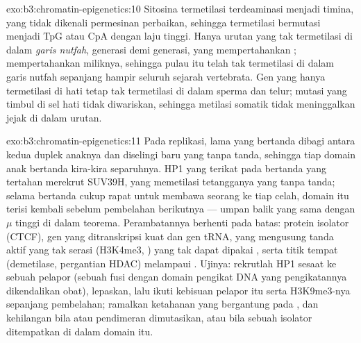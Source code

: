 \begin{solution}{exo:b3:chromatin-epigenetics:10}
Sitosina termetilasi terdeaminasi menjadi timina, yang tidak dikenali
permesinan perbaikan, sehingga  termetilasi bermutasi menjadi TpG atau CpA
dengan laju tinggi. Hanya urutan yang tak termetilasi di dalam \emph{garis
nutfah}, generasi demi generasi, yang mempertahankan ; 
mempertahankan miliknya, sehingga pulau itu telah tak termetilasi di dalam
garis nutfah sepanjang hampir seluruh sejarah vertebrata. Gen yang hanya
termetilasi di hati tetap tak termetilasi di dalam sperma dan telur; mutasi
yang timbul di sel hati tidak diwariskan, sehingga metilasi somatik tidak
meninggalkan jejak di dalam urutan.
\end{solution}

\begin{solution}{exo:b3:chromatin-epigenetics:11}
Pada replikasi,  lama yang bertanda dibagi antara kedua duplek anaknya
dan diselingi  baru yang tanpa tanda, sehingga tiap domain anak
bertanda kira-kira separuhnya. HP1 yang terikat pada  bertanda yang
tertahan merekrut SUV39H, yang memetilasi tetangganya yang tanpa tanda;
selama  bertanda cukup rapat untuk membawa seorang  ke tiap
celah, domain itu terisi kembali sebelum pembelahan berikutnya --- umpan
balik yang sama dengan $\mu$ tinggi di dalam teorema. Perambatannya berhenti
pada batas: protein isolator (CTCF), gen yang ditranskripsi kuat dan gen
tRNA,  yang mengusung tanda aktif yang tak serasi (H3K4me3,
) yang tak dapat dipakai , serta titik tempat 
(demetilase, pergantian HDAC) melampaui . Ujinya: rekrutlah HP1
sesaat ke sebuah pelapor (sebuah fusi dengan domain pengikat DNA yang
pengikatannya dikendalikan obat), lepaskan, lalu ikuti kebisuan pelapor itu
serta H3K9me3-nya sepanjang pembelahan; ramalkan ketahanan yang bergantung
pada , dan kehilangan bila  atau pendimeran 
dimutasikan, atau bila sebuah isolator ditempatkan di dalam domain itu.
\end{solution}

